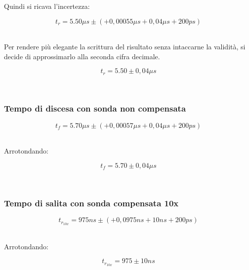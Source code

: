 \documentclass[a4paper]{article}
\begin{document}
Quindi si ricava l'incertezza:
\begin{Large}
	\begin{equation}
  		{t_r}= 5.50\mu s\pm (+ 0,00055\mu s + 0,04\mu s + 200ps)
	\end{equation}
\end{Large}\\
Per rendere più elegante la scrittura del risultato senza intaccarne la validità, si decide di approssimarlo alla seconda cifra decimale.
\begin{Large}
	\begin{equation}
  		{t_r}= 5.50\pm 0,04 \mu s
	\end{equation}
\end{Large}\\
\subsubsection{Tempo di discesa con sonda non compensata}
\begin{Large}
	\begin{equation}
  		{t_f}= 5.70\mu s\pm (+ 0,00057\mu s + 0,04\mu s + 200ps)
	\end{equation}
\end{Large}\\

Arrotondando: 

\begin{Large}
	\begin{equation}
  		{t_f}= 5.70\pm 0,04 \mu s
	\end{equation}
\end{Large}\\

\subsubsection{Tempo di salita con sonda compensata 10x}

\begin{Large}
	\begin{equation}
		{t_{r_{10x}}}= 975ns \pm( + 0,0975ns + 10ns + 200ps)
	\end{equation}
\end{Large}\\

Arrotondando: 

\begin{Large}
	\begin{equation}
		{t_{r_{10x}}}= 975\pm 10 ns
	\end{equation}
\end{Large}\\
\end{document}
